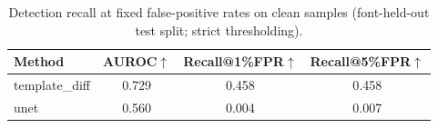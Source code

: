 \begin{table}[t]
\centering
\small
\begin{tabular}{lccc}
\toprule
Method & AUROC$\uparrow$ & Recall@1\%FPR$\uparrow$ & Recall@5\%FPR$\uparrow$ \\
\midrule
template\_diff & 0.729 & 0.458 & 0.458 \\
unet & 0.560 & 0.004 & 0.007 \\
\bottomrule
\end{tabular}
\caption{Detection recall at fixed false-positive rates on clean samples (font-held-out test split; strict thresholding).}
\label{tab:detection_fpr_split}
\end{table}
